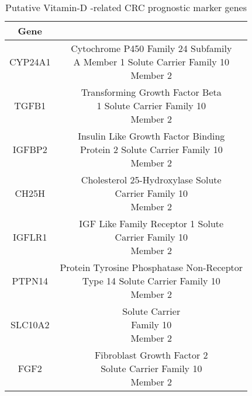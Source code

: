 \documentclass[fleqn,10pt]{SelfArx} %
\begin{document}
\begin{table}[ht]
	\centering
	\begin{tabular}{cc}
		\hline
		Gene & \\
		\hline
		CYP24A1 & \makecell{Cytochrome P450 Family 24 Subfamily \\A Member 1 Solute Carrier Family 10 \\Member 2}\\

			TGFB1 &\makecell{Transforming Growth Factor Beta\\ 1 Solute Carrier Family 10 \\Member 2}\\

			IGFBP2 &\makecell{Insulin Like Growth Factor Binding\\ Protein 2 Solute Carrier Family 10 \\Member 2} \\

			CH25H &\makecell{Cholesterol 25-Hydroxylase Solute\\ Carrier Family 10\\ Member 2} \\

			IGFLR1 &\makecell{IGF Like Family Receptor 1 Solute\\ Carrier Family 10\\ Member 2}\\

			PTPN14 &\makecell{Protein Tyrosine Phosphatase Non-Receptor\\ Type 14 Solute Carrier Family 10\\ Member 2}\\

			SLC10A2 &  \makecell{Solute Carrier\\ Family 10\\ Member 2}\\

			FGF2 &\makecell{Fibroblast Growth Factor 2\\ Solute Carrier Family 10\\ Member 2}\\
		\hline
	\end{tabular}
	\label{tab:suvmark}
	\caption{Putative Vitamin-D -related CRC prognostic marker genes}
\end{table}
\end{document}
